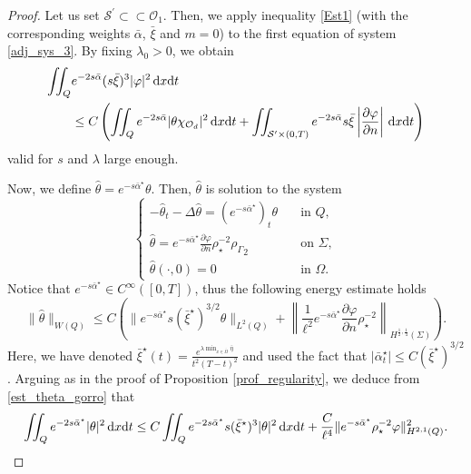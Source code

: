 \documentclass{aims}
\theoremstyle{definition}
\def\csbd{\rho_{\Gamma}}
\def\dx{\,\textnormal{d}x}
\def\dt{\textnormal{d}t}
\begin{document}
\begin{proof}
Let us set $\mathcal S^\prime\subset\subset \mathcal O_1$. Then, we apply inequality \eqref{Est1} (with the corresponding weights $\bar\alpha$, $\bar\xi$ and $m=0$) to the first equation of system \eqref{adj_sys_3}. By fixing $\lambda_0>0$, we obtain
%
\begin{equation}\label{car_init_sec3}
\begin{split}
\iint_Q & e^{-2s\bar\alpha}(s\bar\xi)^3|\varphi|^2\dx\dt\\
&\leq C\left(\iint_{Q}e^{-2s\bar\alpha}|\theta\chi_{\mathcal O_d}|^2\dx\dt+\iint_{\mathcal S^\prime\times(0,T)}e^{-2s\bar\alpha}s\bar\xi\left|\frac{\partial \varphi}{\partial n}\right|\dx\dt\right)
\end{split}
\end{equation}
%
valid for $s$ and $\lambda$ large enough. 

Now, we define $\widehat{\theta}=e^{-s\bar\alpha^\star}\theta$. Then, $\widehat{\theta}$ is solution to the system 
%
\begin{equation*}%
\begin{cases}
-\widehat\theta_t-\Delta \widehat\theta=(e^{-s\bar\alpha^\star})_t\theta &\quad \text{in } Q, \\
\widehat\theta=e^{-s\bar\alpha^\star}\frac{\partial\varphi}{\partial n}\rho_\star^{-2}{\csbd}_{2} &\quad \text{on } \Sigma, \\
\widehat{\theta}(\cdot,0)=0 &\quad\text{in } \Omega.
\end{cases}
\end{equation*}
%
Notice that $e^{-s\bar\alpha^\star}\in C^{\infty}([0,T])$, thus the following energy estimate holds
%
\begin{equation}\label{est_theta_gorro}
\|\widehat\theta\|_{W(Q)}\leq C\left(\|e^{-s\bar\alpha^\star}s(\bar\xi^\star)^{3/2}\theta\|_{L^2(Q)}+\left\|\frac{1}{\ell^2}e^{-s\bar\alpha^\star}\frac{\partial\varphi}{\partial n}\rho_\star^{-2}\right\|_{H^{\frac12,\frac14}(\Sigma)}\right).
\end{equation}
%
Here, we have denoted $\bar{\xi}^\star(t)=\frac{e^{\lambda\min_{x\in \overline\Omega}\bar\eta}}{t^2(T-t)^2}$ and used the fact that $|\bar\alpha^\star_t|\leq C({\bar\xi}^\star)^{3/2}$ . Arguing as in the proof of Proposition \ref{prof_regularity}, we deduce from \eqref{est_theta_gorro} that
%
\begin{equation}\label{est_bar_theta}
\iint_{Q}e^{-2s\bar\alpha^\star}|\theta|^2\dx\dt \leq C\iint_{Q}e^{-2s\bar\alpha^\star}s(\bar\xi^\star)^3|\theta|^2\dx\dt+\frac{C}{\ell^4}\|e^{-s\bar\alpha^\star}\rho_\star^{-2}\varphi\|^2_{H^{2,1}(Q)}.
\end{equation}
%


\end{proof}
\end{document}
